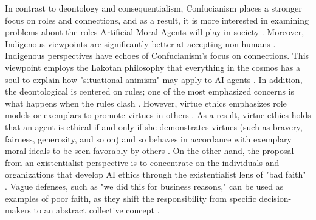 \documentclass[sigconf]{acmart}
\begin{document}
In contrast to deontology and consequentialism, Confucianism places a stronger focus on roles and connections, and as a result, it is more interested in examining problems about the roles Artificial Moral Agents will play in society \cite{zoshak2021beyond}. Moreover, Indigenous viewpoints are significantly better at accepting non-humans \cite{maitra2020artificial}. Indigenous perspectives have echoes of Confucianism's focus on connections. This viewpoint employs the Lakotan philosophy that everything in the cosmos has a soul to explain how "situational animism" may apply to AI agents \cite{maitra2020artificial}. In addition, the deontological is centered on rules; one of the most emphasized concerns is what happens when the rules clash \cite{guarini2012conative}. However, virtue ethics emphasizes role models or exemplars to promote virtues in others \cite{govindarajulu2019toward}. As a result, virtue ethics holds that an agent is ethical if and only if she demonstrates virtues (such as bravery, fairness, generosity, and so on) and so behaves in accordance with exemplary moral ideals to be seen favorably by others \cite{farina2024ai}. On the other hand, the proposal from an existentialist perspective is to concentrate on the individuals and organizations that develop AI ethics through the existentialist lens of "bad faith" \cite{terzis2020onward}. Vague defenses, such as "we did this for business reasons," can be used as examples of poor faith, as they shift the responsibility from specific decision-makers to an abstract collective concept \cite{farina2024ai}.
\end{document}
